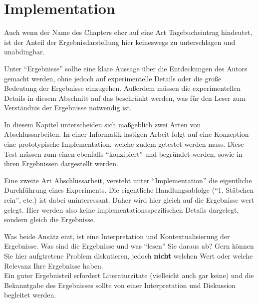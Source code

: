 

\clearpage

\chapter{Implementation}

Auch wenn der Name des Chapters eher auf eine Art Tagebucheintrag hindeutet, ist der Anteil der Ergebnisdarstellung hier keineswegs zu unterschlagen und unabdingbar.

Unter \enquote{Ergebnisse} sollte eine klare Aussage über die Entdeckungen des Autors gemacht werden, ohne jedoch auf experimentelle Details oder die große Bedeutung der Ergebnisse einzugehen. 
Außerdem müssen die experimentellen Details in diesem Abschnitt auf das beschränkt werden, was für den Leser zum Verständnis der Ergebnisse notwendig ist.

In diesem Kapitel unterscheiden sich maßgeblich zwei Arten von Abschlussarbeiten. In einer Informatik-lastigen Arbeit folgt auf eine Konzeption eine prototypische Implementation,
welche zudem getestet werden muss. Diese Test müssen zum einen ebenfalls \enquote{konzipiert} und begründet werden, sowie in ihren Ergebnissen dargestellt werden.

Eine zweite Art Abschlussarbeit, versteht unter \enquote{Implementation} die eigentliche Durchführung eines Experiments. Die eigentliche Handlungsabfolge (\enquote{1. Stäbchen rein}, etc.) ist dabei 
uninteressant. Daher wird hier gleich auf die Ergebnisse wert gelegt. Hier werden also keine implementationsspezifischen Details dargelegt, sondern gleich die Ergebnisse.

Was beide Ansätz eint, ist eine Interpretation und Kontextualisierung der Ergebnisse. Was sind die Ergebnisse und was \enquote{lesen} Sie daraus ab?
Gern können Sie hier aufgtretene Problem diskutieren, jedoch \textbf{nicht} welchen Wert oder welche Relevanz Ihre Ergebnisse haben.\\

Ein guter Ergebnisteil erfordert Literaturzitate (vielleicht auch gar keine) und die Bekanntgabe des Ergebnisses sollte von einer Interpretation und Diskussion begleitet werden. 

